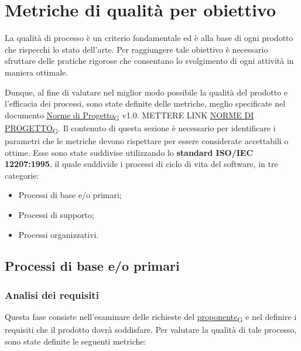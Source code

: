 \section{Metriche di qualità per obiettivo}
La qualità di processo è un criterio fondamentale ed è alla base di ogni prodotto
che rispecchi lo stato dell'arte. Per raggiungere tale obiettivo è necessario
sfruttare delle pratiche rigorose che consentano lo svolgimento di ogni attività
in maniera ottimale.

Dunque, al fine di valutare nel miglior modo possibile la qualità del prodotto e l'efficacia dei processi, sono state definite delle metriche, meglio specificate nel documento \href{https://7last.github.io/docs/rtb/documentazione-interna/glossario#norme-di-progetto}{Norme di Progetto\textsubscript{G}} v1.0. METTERE LINK \href{https://7last.github.io/docs/rtb/documentazione-interna/glossario#norme-di-progetto}{NORME DI PROGETTO\textsubscript{G}}. Il contenuto di
questa sezione è necessario per identificare i parametri che le metriche devono rispettare per essere considerate accettabili o ottime.
Esse sono state suddivise utilizzando lo \textbf{standard ISO/IEC 12207:1995}, il quale suddivide i processi di ciclo di vita del software, in tre categorie:
\begin{itemize}
	\item Processi di base e/o primari;
	\item Processi di supporto;
	\item Processi organizzativi.
\end{itemize}

\subsection{Processi di base e/o primari}
\subsubsection{Analisi dei requisiti}
Questa fase consiste nell'esaminare delle richieste del \href{https://7last.github.io/docs/rtb/documentazione-interna/glossario#proponente}{proponente\textsubscript{G}} e nel definire i requisiti che il prodotto dovrà soddisfare. Per valutare la qualità di tale processo, sono state definite le seguenti metriche:


